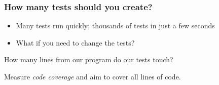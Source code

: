 \documentclass{beamer}
\begin{document}
	\frame
	{
		\frametitle{How many tests should you create?}

		\begin{itemize}
			\item Many tests run quickly; thousands of tests in just a few seconds
			\item What if you need to change the tests?
		\end{itemize}
		
		\pause
		How many lines from our program do our tests touch?
		
		\pause
		Measure \emph{code coverage} and aim to cover all lines of code.
	}
\end{document}
